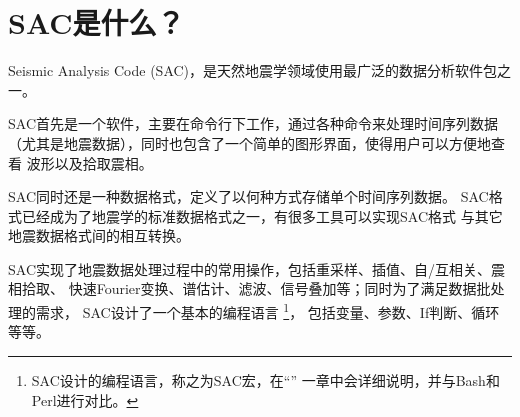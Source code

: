 \section{SAC是什么？}

Seismic Analysis Code (SAC)，是天然地震学领域使用最广泛的数据分析软件包之一。

SAC首先是一个软件，主要在命令行下工作，通过各种命令来处理时间序列数据
（尤其是地震数据），同时也包含了一个简单的图形界面，使得用户可以方便地查看
波形以及拾取震相。

SAC同时还是一种数据格式，定义了以何种方式存储单个时间序列数据。
SAC格式已经成为了地震学的标准数据格式之一，有很多工具可以实现SAC格式
与其它地震数据格式间的相互转换。

SAC实现了地震数据处理过程中的常用操作，包括重采样、插值、自/互相关、震相拾取、
快速Fourier变换、谱估计、滤波、信号叠加等；同时为了满足数据批处理的需求，
SAC设计了一个基本的编程语言
\footnote{SAC设计的编程语言，称之为SAC宏，在``''
一章中会详细说明，并与Bash和Perl进行对比。}，
包括变量、参数、If判断、循环等等。

